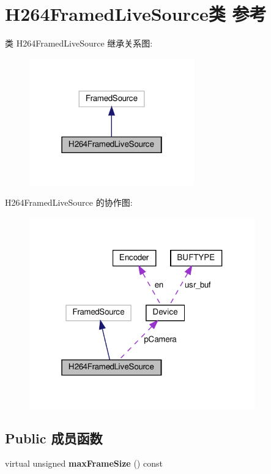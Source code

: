 \hypertarget{class_h264_framed_live_source}{}\section{H264\+Framed\+Live\+Source类 参考}
\label{class_h264_framed_live_source}


类 H264\+Framed\+Live\+Source 继承关系图\+:
\nopagebreak
\begin{figure}[H]
\begin{center}
\leavevmode
\includegraphics[width=202pt]{class_h264_framed_live_source__inherit__graph}
\end{center}
\end{figure}


H264\+Framed\+Live\+Source 的协作图\+:
\nopagebreak
\begin{figure}[H]
\begin{center}
\leavevmode
\includegraphics[width=277pt]{class_h264_framed_live_source__coll__graph}
\end{center}
\end{figure}
\subsection*{Public 成员函数}
\begin{DoxyCompactItemize}
\item 
\mbox{\label{class_h264_framed_live_source_a5dcb3b51f285787f61818302367ce3d2}} 
virtual unsigned {\bfseries max\+Frame\+Size} () const
\end{DoxyCompactItemize}
